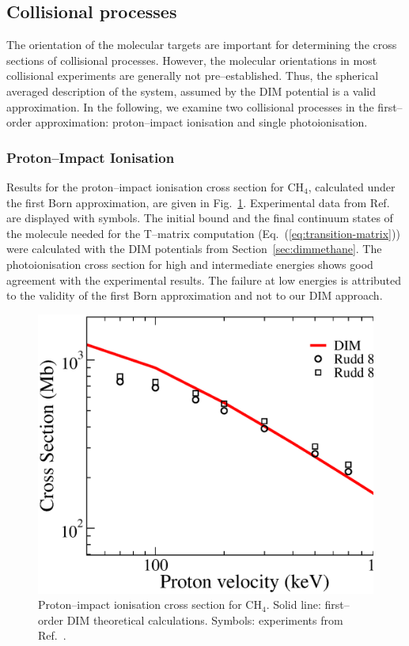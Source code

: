 \documentclass[10pt]{article}
\begin{document}
\subsection{Collisional processes}

The orientation of the molecular targets are important for determining
the cross sections of collisional processes. However, the molecular 
orientations in most collisional experiments are generally not 
pre--established. Thus, the spherical averaged description of the system, 
assumed by the DIM potential is a valid approximation. In the 
following, we examine two collisional processes in the first--order 
approximation: proton--impact ionisation 
and single photoionisation. 

\subsubsection{Proton--Impact Ionisation}

Results for the proton--impact ionisation cross section for CH$_4$,
calculated under the first Born approximation, are given in 
Fig.~\ref{fig:ionch4}. 
Experimental data from Ref.~\cite{Rudd1983,Rudd1985} are displayed 
with symbols. The initial bound and the final continuum states 
of the molecule needed for the T--matrix computation 
(Eq.~(\ref{eq:transition-matrix})) were calculated 
with the DIM potentials from Section~\ref{sec:dimmethane}. 
The photoionisation cross section for high and intermediate energies
shows good agreement with the experimental results. The failure at
low energies is attributed to the validity of the first Born 
approximation and not to our DIM approach.

\begin{figure}[H]
\centering
\includegraphics[height=0.23\textheight]{figures/dimpot/born_ionch4.eps}
\caption{Proton--impact ionisation cross section for CH$_4$. Solid 
line: first--order DIM theoretical calculations. Symbols: experiments 
from Ref.~\cite{Rudd1983,Rudd1985}.}
\label{fig:ionch4}
\end{figure}
\end{document}
